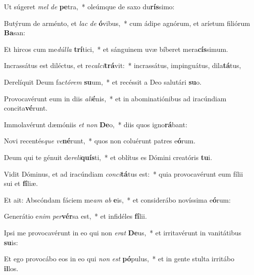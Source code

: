 \item Ut súgeret \textit{mel} \textit{de} \textbf{pe}tra,~* oleúmque de saxo du\textbf{rís}simo:
\item Butýrum de arménto, et \textit{lac} \textit{de} \textbf{ó}vibus,~* cum ádipe agnórum, et aríetum filiórum \textbf{Ba}san:
\item Et hircos cum me\textit{dúl}\textit{la} \textbf{trí}tici,~* et sánguinem uvæ bíberet mera\textbf{cís}simum.
\item Incrassátus est diléctus, et re\textit{cal}\textit{ci}\textbf{trá}vit:~* incrassátus, impinguátus, dila\textbf{tá}tus,
\item Derelíquit Deum fac\textit{tó}\textit{rem} \textbf{su}um,~* et recéssit a Deo salutári \textbf{su}o.
\item Provocavérunt eum in diis \textit{a}\textit{li}\textbf{é}nis,~* et in abominatiónibus ad iracúndiam concita\textbf{vé}runt.
\item Immolavérunt dæmóniis \textit{et} \textit{non} \textbf{De}o,~* diis quos igno\textbf{rá}bant:
\item Novi recentés\textit{que} \textit{ve}\textbf{né}runt,~* quos non coluérunt patres e\textbf{ó}rum.
\item Deum qui te génuit de\textit{re}\textit{li}\textbf{quís}ti,~* et oblítus es Dómini creatóris \textbf{tu}i.
\item Vidit Dóminus, et ad iracúndiam \textit{con}\textit{ci}\textbf{tá}tus est:~* quia provocavérunt eum fílii sui et \textbf{fí}liæ.
\item Et ait: Abscóndam fáciem me\textit{am} \textit{ab} \textbf{e}is,~* et considerábo novíssima e\textbf{ó}rum:
\item Generátio e\textit{nim} \textit{per}\textbf{vér}sa est,~* et infidéles \textbf{fí}lii.
\item Ipsi me provocavérunt in eo qui non \textit{e}\textit{rat} \textbf{De}us,~* et irritavérunt in vanitátibus \textbf{su}is:
\item Et ego provocábo eos in eo qui \textit{non} \textit{est} \textbf{pó}pulus,~* et in gente stulta irritábo \textbf{il}los.
